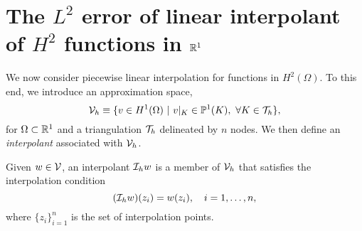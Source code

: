 \begin{proposition}
\end{proposition}


\section{The $L^2$ error of linear interpolant of $H^2$ functions in $\mathbb{R}^1$}
\label{sec:th_interp_l2_h2}
We now consider piecewise linear interpolation for functions in $H^2(\Omega)$. To this end, we introduce an approximation space,
\begin{equation*}
  \mathcal{V}_h \equiv \{ v \in H^1(\Omega) \ | \ v|_K \in \mathbb{P}^1(K), \ \forall K \in \mathcal{T}_h \},
\end{equation*}
for $\Omega \subset \mathbb{R}^1$ and a triangulation $\mathcal{T}_h$ delineated by $n$ nodes.  We then define an \emph{interpolant} associated with $\mathcal{V}_h$.
\begin{definition}[interpolant]
Given $w \in \mathcal{V}$, an interpolant $\mathcal{I}_h w$ is a member of $\mathcal{V}_h$ that satisfies the interpolation condition
\begin{equation*}
  (\mathcal{I}_h w)(z_i) = w(z_i), \quad i = 1,\dots, n,
\end{equation*}
where $\{z_i \}_{i=1}^n$ is the set of interpolation points.
\end{definition}

